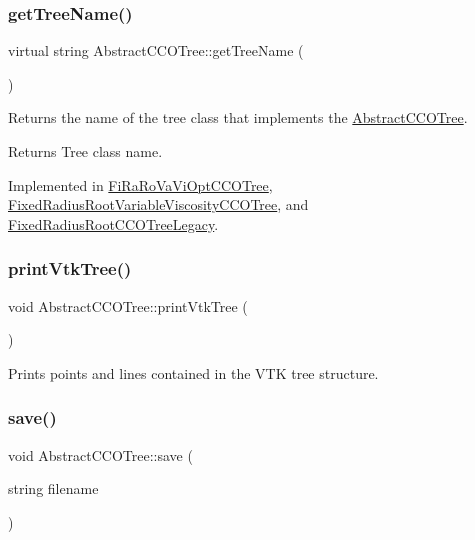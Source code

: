 \subsubsection{\texorpdfstring{get\+Tree\+Name()}{getTreeName()}}
{\footnotesize\ttfamily virtual string Abstract\+C\+C\+O\+Tree\+::get\+Tree\+Name (\begin{DoxyParamCaption}{ }\end{DoxyParamCaption})\hspace{0.3cm}{\ttfamily [pure virtual]}}

Returns the name of the tree class that implements the \mbox{\hyperlink{class_abstract_c_c_o_tree}{Abstract\+C\+C\+O\+Tree}}. \begin{DoxyReturn}{Returns}
Tree class name. 
\end{DoxyReturn}


Implemented in \mbox{\hyperlink{class_fi_ra_ro_va_vi_opt_c_c_o_tree_ab9e0556084e74d15d63900dd2f51059e}{Fi\+Ra\+Ro\+Va\+Vi\+Opt\+C\+C\+O\+Tree}}, \mbox{\hyperlink{class_fixed_radius_root_variable_viscosity_c_c_o_tree_a91a2933c13c695bc5ab1f1b3b4b40350}{Fixed\+Radius\+Root\+Variable\+Viscosity\+C\+C\+O\+Tree}}, and \mbox{\hyperlink{class_fixed_radius_root_c_c_o_tree_legacy_af66ee29f27519813afaa18842d132520}{Fixed\+Radius\+Root\+C\+C\+O\+Tree\+Legacy}}.

\mbox{\label{class_abstract_c_c_o_tree_a91dfce34a13f82208d0bf085304aef1b}} 
\subsubsection{\texorpdfstring{print\+Vtk\+Tree()}{printVtkTree()}}
{\footnotesize\ttfamily void Abstract\+C\+C\+O\+Tree\+::print\+Vtk\+Tree (\begin{DoxyParamCaption}{ }\end{DoxyParamCaption})}

Prints points and lines contained in the V\+TK tree structure. \mbox{\label{class_abstract_c_c_o_tree_a9cc80ae6c23571710a3db688a6c1a3b0}} 
\subsubsection{\texorpdfstring{save()}{save()}}
{\footnotesize\ttfamily void Abstract\+C\+C\+O\+Tree\+::save (\begin{DoxyParamCaption}\item[{string}]{filename }\end{DoxyParamCaption})\hspace{0.3cm}{\ttfamily [virtual]}}

